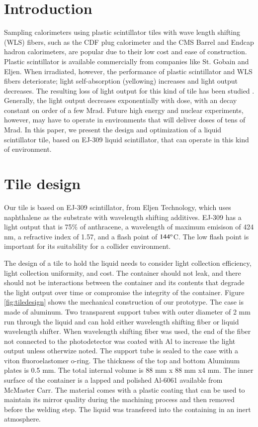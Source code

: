 \documentclass[review]{elsarticle}
\begin{document}
\linenumbers

\section{Introduction}
Sampling calorimeters using plastic scintillator tiles with wave length shifting (WLS) fibers, such as the CDF plug calorimeter \cite{Aota1995557}
and the CMS Barrel\cite{CMSHB} and Endcap\cite{HCALTDR1997} hadron calorimeters, are popular due to their low cost and ease of construction.  Plastic scintillator is available commercially from companies like St. Gobain and Eljen.  When irradiated, however, the performance of plastic scintillator and WLS fibers deteriorate; light self-absorption (yellowing) increases and light output decreases.  The resulting loss of light output for this kind of tile has been studied
\cite{vasken}\cite{ByonWagner1993263}.
Generally, the light output decreases exponentially with dose, with an decay constant on order of a few Mrad.  Future high energy and nuclear experiments, however, may have to operate in environments that will deliver doses of tens of Mrad.  In this paper, we present the design and optimization of a liquid scintillator tile, based on EJ-309 liquid scintillator, that can operate in this kind of environment.


\section{Tile design}

Our tile is based on EJ-309 scintillator, from Eljen Technology, which uses naphthalene as the substrate with wavelength shifting additives.  EJ-309 has a light output that is 75\% of anthracene, a wavelength of maximum emisison of 424 nm, a refractive index of 1.57, and a flash point of $\rm{144^o}$C.  The low flash point is important for its suitability for a collider environment.

The design of a tile to hold the liquid needs to consider light collection efficiency, light collection uniformity, and cost.  The container should not leak, and there should not be interactions between the container and its contents that degrade the light output over time or compromise the integrity
of the container.
Figure \ref{fig:tiledesign} shows the mechanical construction of our prototype.  The case is made of aluminum.  Two transparent support tubes with outer diameter of 2 mm run through the liquid and can hold either wavelength shifting fiber or liquid wavelength shifter.  When wavelength shifting fiber was used, the end of the fiber not connected to the photodetector was coated with Al to increase the light output unless otherwize noted.
The support tube is sealed to the case with a viton fluoroelastomer o-ring.  The thickness of the top and bottom Aluminum plates is 0.5 mm.  The total internal volume is 88 mm x 88 mm x4 mm. The inner surface of the container
is a lapped and polished Al-6061 available from McMaster Carr. The material comes with a plastic coating that can be 
used to maintain its mirror quality during the machining process and then removed before the welding step.  The liquid was transfered into the containing in an inert atmosphere.
\end{document}
